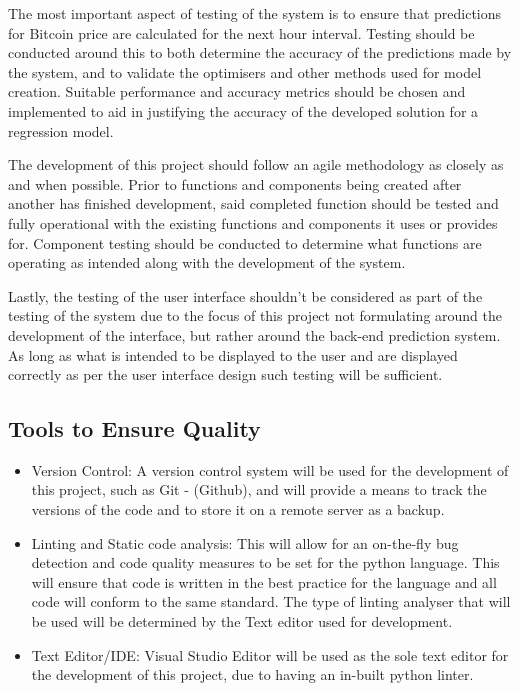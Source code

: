 \documentclass[oneside, 12pt]{article}
\begin{document}
	The most important aspect of testing of the system is to ensure that predictions for Bitcoin price are calculated for the next hour interval. Testing should be conducted around this to both determine the accuracy of the predictions made by the system, and to validate the optimisers and other methods used for model creation. Suitable performance and accuracy metrics should be chosen and implemented to aid in justifying the accuracy of the developed solution for a regression model.
	
	The development of this project should follow an agile methodology as closely as and when possible. Prior to functions and components being created after another has finished development, said completed function should be tested and fully operational with the existing functions and components it uses or provides for. Component testing should be conducted to determine what functions are operating as intended along with the development of the system.
	
	Lastly, the testing of the user interface shouldn't be considered as part of the testing of the system due to the focus of this project not formulating around the development of the interface, but rather around the back-end prediction system. As long as what is intended to be displayed to the user and are displayed correctly as per the user interface design such testing will be sufficient.
	
	\subsection{Tools to Ensure Quality}
	
	\begin{itemize}
		\item Version Control: A version control system will be used for the development of this project, such as Git - (Github), and will provide a means to track the versions of the code and to store it on a remote server as a backup.
		\item Linting and Static code analysis: This will allow for an on-the-fly bug detection and code quality measures to be set for the python language. This will ensure that code is written in the best practice for the language and all code will conform to the same standard. The type of linting analyser that will be used will be determined by the Text editor used for development.
		\item Text Editor/IDE: Visual Studio Editor will be used as the sole text editor for the development of this project, due to having an in-built python linter.
	\end{itemize}
	
\end{document}
